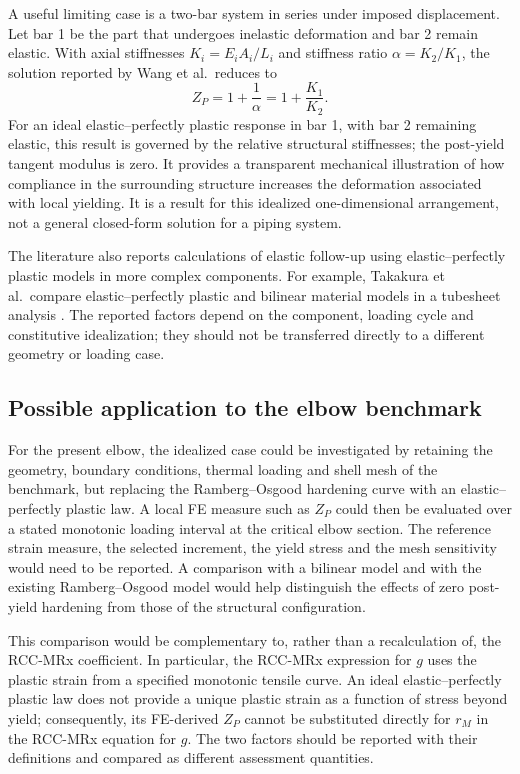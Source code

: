 \documentclass[11pt,a4paper]{article}
\begin{document}
A useful limiting case is a two-bar system in series under imposed displacement. Let bar 1 be the part that undergoes inelastic deformation and bar 2 remain elastic. With axial stiffnesses $K_i=E_iA_i/L_i$ and stiffness ratio $\alpha=K_2/K_1$, the solution reported by Wang et al.\ reduces to
\begin{equation}
Z_P=1+\frac{1}{\alpha}
=1+\frac{K_1}{K_2}.
\label{eq:zp-two-bars}
\end{equation}
For an ideal elastic--perfectly plastic response in bar 1, with bar 2 remaining elastic, this result is governed by the relative structural stiffnesses; the post-yield tangent modulus is zero. It provides a transparent mechanical illustration of how compliance in the surrounding structure increases the deformation associated with local yielding. It is a result for this idealized one-dimensional arrangement, not a general closed-form solution for a piping system.

The literature also reports calculations of elastic follow-up using elastic--perfectly plastic models in more complex components. For example, Takakura et al.\ compare elastic--perfectly plastic and bilinear material models in a tubesheet analysis \cite{Takakura1995}. The reported factors depend on the component, loading cycle and constitutive idealization; they should not be transferred directly to a different geometry or loading case.

\subsection*{Possible application to the elbow benchmark}

For the present elbow, the idealized case could be investigated by retaining the geometry, boundary conditions, thermal loading and shell mesh of the benchmark, but replacing the Ramberg--Osgood hardening curve with an elastic--perfectly plastic law. A local FE measure such as $Z_P$ could then be evaluated over a stated monotonic loading interval at the critical elbow section. The reference strain measure, the selected increment, the yield stress and the mesh sensitivity would need to be reported. A comparison with a bilinear model and with the existing Ramberg--Osgood model would help distinguish the effects of zero post-yield hardening from those of the structural configuration.

This comparison would be complementary to, rather than a recalculation of, the RCC-MRx coefficient. In particular, the RCC-MRx expression for $g$ uses the plastic strain from a specified monotonic tensile curve. An ideal elastic--perfectly plastic law does not provide a unique plastic strain as a function of stress beyond yield; consequently, its FE-derived $Z_P$ cannot be substituted directly for $r_M$ in the RCC-MRx equation for $g$. The two factors should be reported with their definitions and compared as different assessment quantities.
\end{document}
